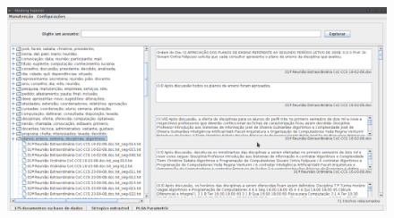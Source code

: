 \begin{figure}[h!]
\center
	\includegraphics[width=.9\textwidth]{prints/print-experimento-01.png} 
\end{figure}












 


